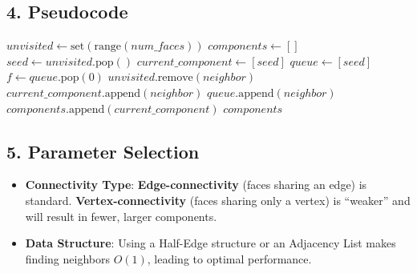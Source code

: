 

\subsection{4. Pseudocode}

\begin{algorithm}
\caption{Find Mesh Components}
\label{alg:find_mesh_components}
\begin{algorithmic}[1]
    \State $\mathit{unvisited} \gets \text{set}(\text{range}(\mathit{num\_faces}))$
    \State $\mathit{components} \gets []$
        \State $\mathit{seed} \gets \mathit{unvisited}.\text{pop}()$
        \State $\mathit{current\_component} \gets [\mathit{seed}]$
        \State $\mathit{queue} \gets [\mathit{seed}]$
            \State $f \gets \mathit{queue}.\text{pop}(0)$
                    \State $\mathit{unvisited}.\text{remove}(\mathit{neighbor})$
                    \State $\mathit{current\_component}.\text{append}(\mathit{neighbor})$
                    \State $\mathit{queue}.\text{append}(\mathit{neighbor})$
                \EndIf
            \EndFor
        \EndWhile
        \State $\mathit{components}.\text{append}(\mathit{current\_component})$
    \EndWhile
    \State \Return $\mathit{components}$
\EndFunction
\end{algorithmic}
\end{algorithm}

\subsection{5. Parameter Selection}

\begin{itemize}
    \item \textbf{Connectivity Type}: \textbf{Edge-connectivity} (faces sharing an edge) is standard. \textbf{Vertex-connectivity} (faces sharing only a vertex) is ``weaker'' and will result in fewer, larger components.
    \item \textbf{Data Structure}: Using a Half-Edge\cite{guibas1985} structure or an Adjacency List makes finding neighbors $O(1)$, leading to optimal performance.
\end{itemize}

